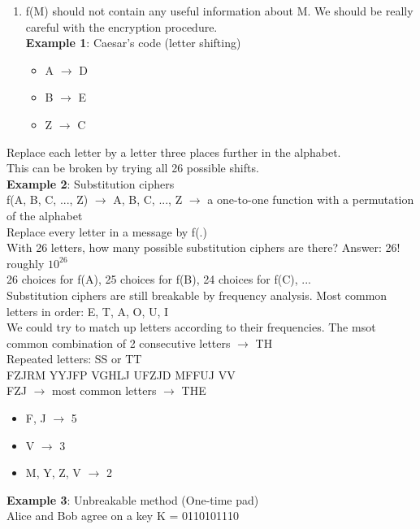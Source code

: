 \documentclass[9pt, letterpaper, oneside]{article}
\begin{document}
\begin{enumerate}
    \item f(M) should not contain any useful information about M. We should be really careful with the encryption procedure.\\
    \textbf{Example 1}: Caesar's code (letter shifting)\\
    \begin{itemize}
        \item A $\to$ D
        \item B $\to$ E
        \item Z $\to$ C
    \end{itemize}
 \end{enumerate}%
    Replace each letter by a letter three places further in the alphabet.\\
    This can be broken by trying all 26 possible shifts.\\
    \textbf{Example 2}: Substitution ciphers\\
    f({A, B, C, ..., Z}) $\to$ {A, B, C, ..., Z} $\to$ a one-to-one function with a permutation of the alphabet\\
    Replace every letter in a message by f(.)\\
    With 26 letters, how many possible substitution ciphers are there? Answer: 26! roughly $10^{26}$\\
    26 choices for f(A), 25 choices for f(B), 24 choices for f(C), ...\\
    Substitution ciphers are still breakable by frequency analysis. Most common letters in order: E, T, A, O, U, I\\
    We could try to match up letters according to their frequencies. The msot common combination of 2 consecutive letters $\to$ TH\\
    Repeated letters: SS or TT\\
    FZJRM YYJFP VGHLJ UFZJD MFFUJ VV\\
    FZJ $\to$ most common letters $\to$ THE\\
    \begin{itemize}
        \item F, J $\to$ 5
        \item V $\to$ 3
        \item M, Y, Z, V $\to$ 2
    \end{itemize}
    \textbf{Example 3}: Unbreakable method (One-time pad)\\
    Alice and Bob agree on a key K = 0110101110\\
\end{document}
